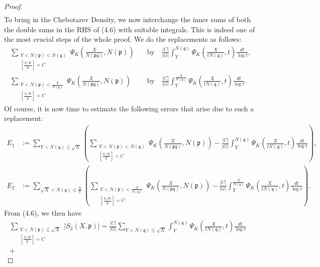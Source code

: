 \documentclass[12pt]{article}
\numberwithin{equation}{section}
\numberwithin{equation}{section}
\begin{document}
\begin{proof}
\begin{align}
        \end{align}
        To bring in the Chebotarev Density, we now interchange the inner sums of both the double sums in the RHS of (4.6) with suitable integrals. This is indeed one of the most crucial steps of the whole proof. We do the replacements as follows:
        \begin{align}
            \sum_{\substack{Y<N(\mathfrak{p})<N(\mathfrak{q}) \\ \left[\frac{L/K}{\mathfrak{p}}\right] =C}} \Psi_K\left(\frac{X}{N(\mathfrak{p}\mathfrak{q})},N(\mathfrak{p})\right) \quad &\text{by} \quad \frac{|C|}{|G|}\int_Y^{N(\mathfrak{q})} \Psi_K\left(\frac{X}{tN(\mathfrak{q})},t\right)\frac{dt}{\log t} ,\nonumber \\
     \sum_{\substack{Y<N(\mathfrak{p})<\frac{X}{N(\mathfrak{q})} \\ \left[\frac{L/K}{\mathfrak{p}}\right] =C}} \Psi_K\left(\frac{X}{N(\mathfrak{p}\mathfrak{q})},N(\mathfrak{p})\right) \quad &\text{by} \quad \frac{|C|}{|G|}\int_Y^{\frac{X}{N(\mathfrak{q})}} \Psi_K\left(\frac{X}{tN(\mathfrak{q})},t\right)\frac{dt}{\log t}. \nonumber
        \end{align}
         Of course, it is now time to estimate the following errors that arise due to such a replacement:
    \begin{align}
        E_1&:=\sum_{Y<N(\mathfrak{q})\leq \sqrt{X}}\left(\sum_{\substack{Y<N(\mathfrak{p})<N(\mathfrak{q}) \\ \left[\frac{L/K}{\mathfrak{p}}\right] =C}} \Psi_K\left(\frac{X}{N(\mathfrak{p}\mathfrak{q})},N(\mathfrak{p})\right) - \frac{|C|}{|G|}\int_Y^{N(\mathfrak{q})} \Psi_K\left(\frac{X}{tN(\mathfrak{q})},t\right)\frac{dt}{\log t}\right) ,\nonumber \\
     E_2 &:=\sum_{\sqrt{X}<N(\mathfrak{q})\leq \frac{X}{Y}}\left(\sum_{\substack{Y<N(\mathfrak{p})<\frac{X}{N(\mathfrak{q})} \\ \left[\frac{L/K}{\mathfrak{p}}\right] =C}} \Psi_K\left(\frac{X}{N(\mathfrak{p}\mathfrak{q})},N(\mathfrak{p})\right)- \frac{|C|}{|G|}\int_Y^{\frac{X}{N(\mathfrak{q})}} \Psi_K\left(\frac{X}{tN(\mathfrak{q})},t\right)\frac{dt}{\log t}\right) .\nonumber
    \end{align}
From (4.6), we then have 
\begin{align}
    \sum_{\substack{Y<N(\mathfrak{p}) \leq \sqrt{X} \\ \left[\frac{L/K}{\mathfrak{p}}\right] =C}} |S_2(X,\mathfrak{p})| = \frac{|C|}{|G|}\sum_{Y<N(\mathfrak{q})\leq \sqrt{X}}\int_Y^{N(\mathfrak{q})} \Psi_K\left(\frac{X}{tN(\mathfrak{q})},t\right)\frac{dt}{\log t}& \nonumber \\+

\end{align}
\end{proof}
\end{document}
